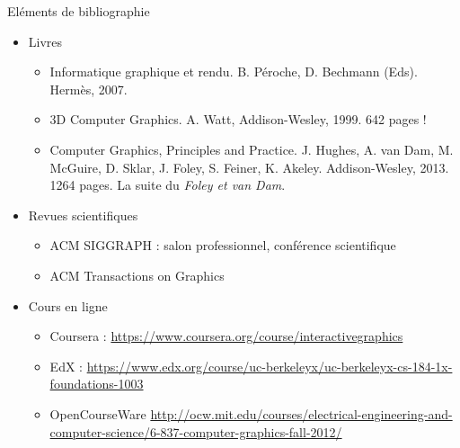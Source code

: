\begin{frame}{Eléments de bibliographie}
\begin{itemize}
\item Livres
\begin{itemize}
\item Informatique graphique et rendu. B. Péroche, D. Bechmann (Eds). Hermès, 2007.
\item 3D Computer Graphics. A. Watt, Addison-Wesley, 1999. 642 pages !
\item Computer Graphics, Principles and Practice. J. Hughes, A. van Dam, M. McGuire, D. Sklar, J. Foley, S. Feiner, K. Akeley. Addison-Wesley, 2013. 1264 pages. La suite du \textit{Foley et van Dam}.
\end{itemize}
\item Revues scientifiques
\begin{itemize}
\item ACM SIGGRAPH : salon professionnel, conférence scientifique
\item ACM Transactions on Graphics
\end{itemize}
\item Cours en ligne
\begin{itemize}
\item Coursera : \url{https://www.coursera.org/course/interactivegraphics}
\item EdX : \url{https://www.edx.org/course/uc-berkeleyx/uc-berkeleyx-cs-184-1x-foundations-1003}
\item OpenCourseWare \url{http://ocw.mit.edu/courses/electrical-engineering-and-computer-science/6-837-computer-graphics-fall-2012/}
\end{itemize}
\end{itemize}
\end{frame}
